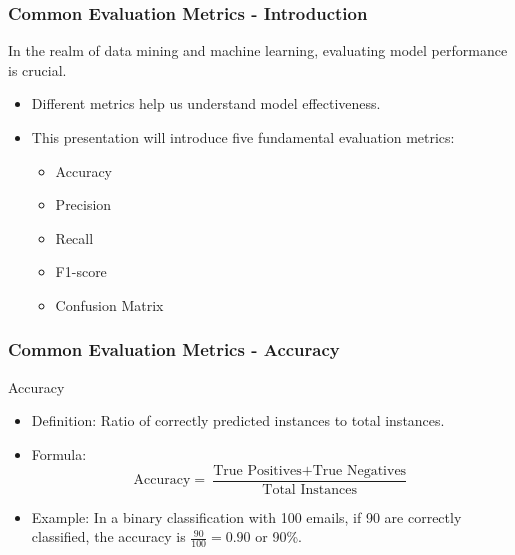\documentclass[aspectratio=169]{beamer}
\begin{document}
\begin{frame}[fragile]
    \frametitle{Common Evaluation Metrics - Introduction}
    In the realm of data mining and machine learning, evaluating model performance is crucial.
    
    \begin{itemize}
        \item Different metrics help us understand model effectiveness.
        \item This presentation will introduce five fundamental evaluation metrics:
        \begin{itemize}
            \item Accuracy
            \item Precision
            \item Recall
            \item F1-score
            \item Confusion Matrix
        \end{itemize}
    \end{itemize}
\end{frame}

\begin{frame}[fragile]
    \frametitle{Common Evaluation Metrics - Accuracy}
    \begin{block}{Accuracy}
        \begin{itemize}
            \item Definition: Ratio of correctly predicted instances to total instances.
            \item Formula: 
            \[
            \text{Accuracy} = \frac{\text{True Positives} + \text{True Negatives}}{\text{Total Instances}}
            \]
            \item Example: In a binary classification with 100 emails, if 90 are correctly classified, the accuracy is \( \frac{90}{100} = 0.90 \) or 90\%.
        \end{itemize}
    \end{block}
\end{frame}
\end{document}
